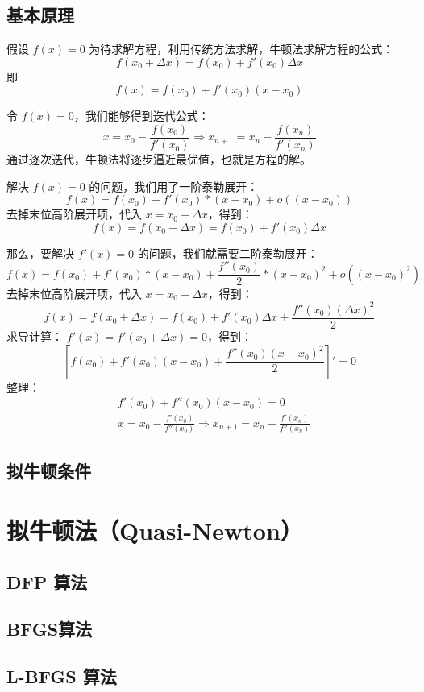 \documentclass[a4paper,10pt]{ctexbook}
\begin{document}
\subsection{基本原理}
假设 $f(x) = 0$ 为待求解方程，利用传统方法求解，牛顿法求解方程的公式：
\[
f(x_0 + \Delta x) = f(x_0) + f'(x_0)\Delta x
\]
即
\[
    f(x) = f(x_0) + f'(x_0)(x - x_0)
\]

令 $f(x) = 0$，我们能够得到迭代公式：
\[
    x = x_0 - \frac{f(x_0)}{f'(x_0)} \Rightarrow x_{n+1} = x_n - \frac{f(x_n)}{f'(x_n)}
\]
通过逐次迭代，牛顿法将逐步逼近最优值，也就是方程的解。

解决 $f(x) = 0$ 的问题，我们用了一阶泰勒展开：
\[
    f(x) = f(x_0) + f'(x_0)*(x-x_0) + o((x-x_0))
\]
去掉末位高阶展开项，代入 $x = x_0 + \Delta x$，得到：
\[
    f(x) = f(x_0 + \Delta x) = f(x_0) + f'(x_0)\Delta x
\]


那么，要解决 $f'(x) = 0$ 的问题，我们就需要二阶泰勒展开：
\[
    f(x) = f(x_0) + f'(x_0)*(x-x_0) + \frac{f''(x_0)}{2}*(x-x_0)^2 + o((x-x_0)^2)
\]
去掉末位高阶展开项，代入 $x = x_0+\Delta x$，得到：
\[
    f(x) = f(x_0+\Delta x) = f(x_0) + f'(x_0) \Delta x + \frac{f''(x_0) (\Delta x)^2}{2}
\]
求导计算： $f'(x) = f'(x_0+\Delta x) = 0$，得到：
\[
    [f(x_0) + f'(x_0)(x−x_0) + \frac{f''(x_0)(x−x_0)^2}{2}]′ = 0
\]
整理：
\begin{align*}
    & f'(x_0) + f''(x_0)(x−x_0) = 0 \\
    & x = x_0 − \frac{f'(x_0)}{f''(x_0)} \Rightarrow  x_{n+1} = x_n - \frac{f'(x_n)}{f''(x_n)}
\end{align*}

\subsection{拟牛顿条件}

\section{拟牛顿法（Quasi-Newton）}
\subsection{DFP 算法}
\subsection{BFGS算法}
\subsection{L-BFGS 算法}
\end{document}
